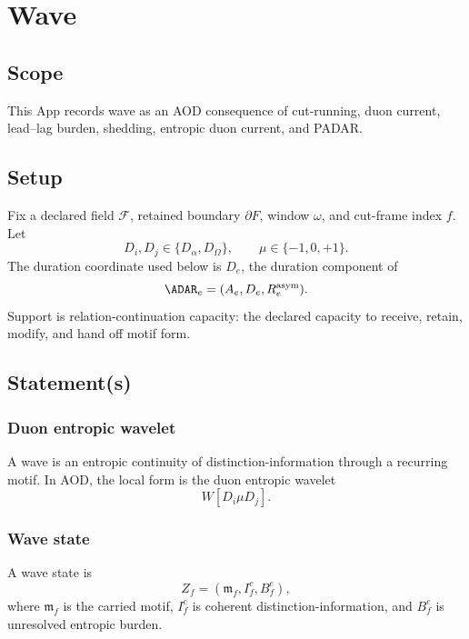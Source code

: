 \section{Wave}
\label{app:wave}

\subsection{Scope}
\label{app:wave:scope}
This App records wave as an AOD consequence of cut-running, duon current, lead--lag burden, shedding, entropic duon current, and PADAR.

\subsection{Setup}
\label{app:wave:setup}
Fix a declared field \(\mathcal F\), retained boundary \(\partial F\), window \(\omega\), and cut-frame index \(f\). Let
\[
D_i,D_j\in\{D_\alpha,D_\Omega\},
\qquad
\mu\in\{-1,0,+1\}.
\]
The duration coordinate used below is \(D_e\), the duration component of
\[
\ADAR_e=(A_e,D_e,R_e^{\mathrm{asym}}).
\]
Support is relation-continuation capacity: the declared capacity to receive, retain, modify, and hand off motif form.

\subsection{Statement(s)}
\label{app:wave:statements}

\subsubsection{Duon entropic wavelet}
\label{app:wave:statements:duon-entropic-wavelet}
A wave is an entropic continuity of distinction-information through a recurring motif. In AOD, the local form is the duon entropic wavelet
\begin{equation}
W[D_i\mu D_j].
\label{app:wave:eq:duon-wavelet}
\end{equation}

\subsubsection{Wave state}
\label{app:wave:statements:state}
A wave state is
\begin{equation}
Z_f=(\mathfrak m_f,I^c_f,B^e_f),
\label{app:wave:eq:state}
\end{equation}
where \(\mathfrak m_f\) is the carried motif, \(I^c_f\) is coherent distinction-information, and \(B^e_f\) is unresolved entropic burden.

